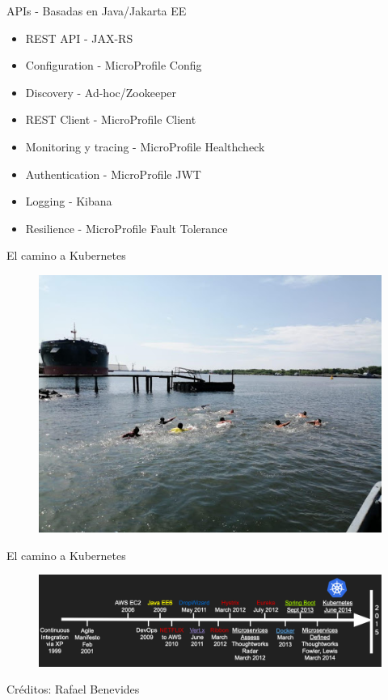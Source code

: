 \documentclass[aspectratio=169]{beamer}
\begin{document}
\begin{frame}{APIs - Basadas en Java/Jakarta EE}
    \begin{itemize}
        \item REST API - JAX-RS
        \item Configuration - MicroProfile Config
        \item Discovery - Ad-hoc/Zookeeper
        \item REST Client - MicroProfile Client
        \item Monitoring y tracing - MicroProfile Healthcheck
        \item Authentication - MicroProfile JWT
        \item Logging - Kibana 
        \item Resilience - MicroProfile Fault Tolerance
    \end{itemize}
\end{frame}

\begin{frame}{El camino a Kubernetes}
    \begin{figure}
        \centering
        \includegraphics[width=0.5\linewidth]{Images/run}
    \end{figure}
\end{frame}


\begin{frame}{El camino a Kubernetes}
    \begin{figure}
        \centering
        \includegraphics[width=\linewidth]{Images/timeline.png}
        \label{fig:contai8ner}
    \end{figure}

    Créditos: Rafael Benevides
\end{frame}
\end{document}
